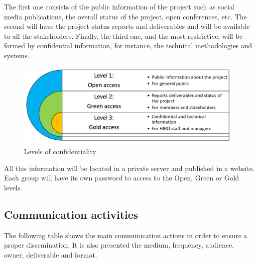The first one consists of the public information of the project such as social media publications, the overall status of the project, open conferences, etc. The second will have the project status reports and deliverables and will be available to all the stakeholders. Finally, the third one, and the most restrictive, will be formed by confidential information, for instance, the technical methodologies and systems.

\begin{figure}[H]
	\centering
	\includegraphics[width=\textwidth]{images/knowledgement.png}
	\caption{Levels of confidentiality} 
	\label{knowledge}
\end{figure}

All this information will be located in a private server and published in a website. Each group will have its own password to access to the Open, Green or Gold levels.

\subsection{Communication activities}

The following table shows the main communication actions in order to ensure a proper dissemination. It is also presented the medium, frequency, audience, owner, deliverable and format.

